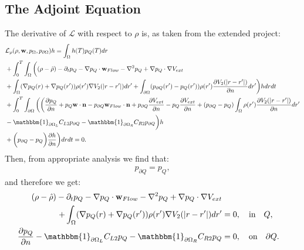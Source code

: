 \documentclass[11pt, a4paper]{article}
\newcommand{\Adja}{{p}_Q}
\newcommand{\Adjc}{p_{\partial Q}}
\theoremstyle{definition}
\begin{document}
\subsection*{The Adjoint Equation}
The derivative of $\mathcal{L}$ with respect to $\rho$ is, as taken from the extended project:
\begin{align*}
&\mathcal{L}_\rho (\rho,\mathbf{w},p_\Omega,p_{\partial \Omega})h=
\int_\Omega h(T) \Adja(T) dr\\
&+ \int_0^T \int_\Omega \bigg( (\rho- \hat{\rho})   - \partial_t \Adja  - \nabla \Adja \cdot \mathbf{w}_{Flow}  - \nabla^2 \Adja \notag 
+  \nabla \Adja \cdot \nabla V_{ext}  \notag \\
&+ \int_\Omega (\nabla  \Adja(r)+\nabla  \Adja(r')) \rho(r') \nabla V_2(|r-r'|) dr'+ \int_{\partial \Omega} ( \Adjc(r') - \Adja(r')) \rho(r')   \frac{\partial V_2(|r-r'|)}{\partial n} dr' \bigg) h dr dt \\
&+  \int_0^T\int_{\partial \Omega}  \bigg(
\bigg(\frac{\partial \Adja }{\partial n} + \Adja  \mathbf{w} \cdot \mathbf{n} - \Adjc \mathbf{w}_{Flow} \cdot \mathbf{n}  +  \Adjc \dfrac{\partial V_{ext}}{\partial n} - \Adja \frac{\partial V_{ext}}{\partial n} + ( \Adjc - \Adja)  \int_\Omega \rho(r') \frac{\partial V_2(|r-r'|)}{\partial n} dr'\\
&-\mathbbm{1}_{\partial \Omega_L} C_{L2} \Adjc   -\mathbbm{1}_{\partial \Omega_R} C_{R2} \Adjc \bigg)h \notag\\
&+ \bigg( \Adjc- \Adja \bigg) \frac{\partial h}{\partial n} \bigg) dr dt =0.
\end{align*}
Then, from appropriate analysis we find that:
\begin{align*}
\Adjc = \Adja,
\end{align*}
and therefore we get:
\begin{align*}
(\rho- \hat{\rho})   - \partial_t  \Adja  - \nabla \Adja \cdot \mathbf{w}_{Flow}  - \nabla^2 \Adja \notag 
+  \nabla \Adja \cdot \nabla V_{ext}  \notag \\
+ \int_\Omega (\nabla  \Adja(r)+\nabla  \Adja(r')) \rho(r') \nabla V_2(|r-r'|) dr' &=0, \quad \text{in} \quad Q, \\
\frac{\partial \Adja }{\partial n}-\mathbbm{1}_{\partial \Omega_L} C_{L2} \Adja   -\mathbbm{1}_{\partial \Omega_R} C_{R2} \Adja&=0, \quad \text{on} \quad \partial Q.
\end{align*}
\end{document}
